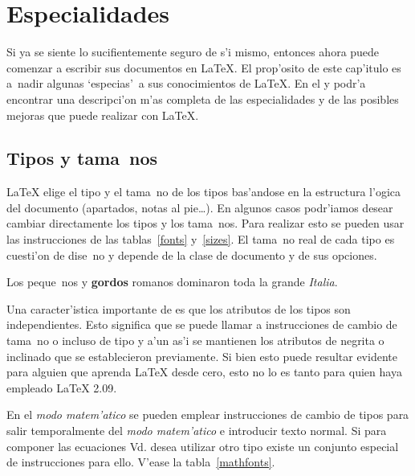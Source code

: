 
\chapter{Especialidades}
\begin{intro}
  Si ya se siente lo sucifientemente seguro de s'i mismo, entonces
  ahora puede comenzar a escribir sus documentos en \LaTeX. El
  prop'osito de este cap'itulo es a~nadir algunas `especias'\ a sus
  conocimientos de \LaTeX. En el {\normalfont\manual{}} y {\normalfont
  \companion} podr'a encontrar una descripci'on m'as completa de las
  especialidades y de las posibles mejoras que puede realizar con
  \LaTeX.
\end{intro}

\section{Tipos y tama~nos}

 \LaTeX{} elige el tipo y el
tama~no de los tipos bas'andose en la estructura l'ogica del
documento (apartados, notas al pie\ldots). En algunos casos podr'iamos
desear cambiar directamente los tipos y los tama~nos. Para realizar
esto se pueden usar las instrucciones de las tablas~\ref{fonts}
y~\ref{sizes}. El tama~no real de cada tipo es cuesti'on de dise~no
y depende de la clase de documento y de sus opciones.

\begin{example}
{\small Los peque~nos y
\textbf{gordos} romanos dominaron}
{\Large toda la grande
\textit{Italia}.}
\end{example}

Una caracter'istica importante de \LaTeXe{} es que los atributos de
los tipos son independientes. Esto significa que se puede llamar a
instrucciones de cambio de tama~no o incluso de tipo y a'un as'i se
mantienen los atributos de negrita o inclinado que se establecieron
previamente. Si bien esto puede resultar evidente para alguien que
aprenda \LaTeX{} desde cero, esto no lo es tanto para quien haya
empleado \LaTeX{} 2.09.

En el \emph{modo matem'atico} se pueden emplear instrucciones de
cambio de tipos para salir temporalmente del \emph{modo matem'atico} e
introducir texto normal. Si para componer las ecuaciones Vd.{} desea
utilizar otro tipo existe un conjunto especial de instrucciones para
ello. V'ease la tabla~\ref{mathfonts}.

